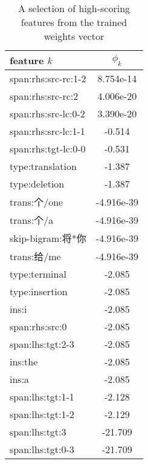 \documentclass[11pt, a4paper]{article}
\begin{document}
\begin{table}
\begin{center}
\begin{tabular}{ |l|c| } 
\hline
feature $k$ & $\phi_k$ \\ 
\hline
span:rhs:src-rc:1-2 &   8.754e-14 \\
span:rhs:src-rc:2   &   4.006e-20 \\
span:rhs:src-lc:0-2 &   3.390e-20 \\
span:rhs:src-lc:1-1 &   -0.514 \\
span:rhs:tgt-lc:0-0 &   -0.531 \\
type:translation    &   -1.387 \\
type:deletion       &   -1.387 \\
trans:个/one         &-4.916e-39 \\
trans:个/a           & -4.916e-39 \\
skip-bigram:将*你    & -4.916e-39 \\
trans:给/me          & -4.916e-39 \\
type:terminal       &   -2.085 \\
type:insertion      &   -2.085 \\
ins:i               &   -2.085 \\
span:rhs:src:0      &   -2.085 \\
span:lhs:tgt:2-3    &   -2.085 \\
ins:the             &   -2.085 \\
ins:a               &   -2.085 \\
span:lhs:tgt:1-1    &   -2.128 \\
span:lhs:tgt:1-2    &   -2.129 \\
span:lhs:tgt:3      &   -21.709 \\
span:lhs:tgt:0-3    &   -21.709 \\
\hline
\end{tabular}
\end{center}
\caption{A selection of high-scoring features from the trained weights vector}
\label{table:features}
\end{table}
\end{document}
